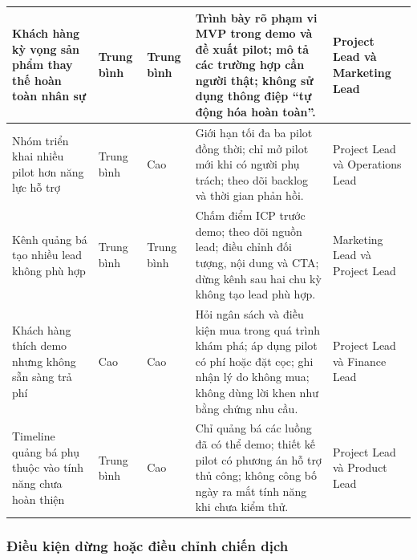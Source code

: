 \begin{table}[H]
\begin{tabularx}{\textwidth}{
        p{}
        p{}
        p{}
        X
        p{}
    }
        \hline

        Khách hàng kỳ vọng sản phẩm thay thế hoàn toàn nhân sự
        &
        Trung bình
        &
        Trung bình
        &
        Trình bày rõ phạm vi MVP trong demo và đề xuất pilot; mô tả các trường hợp cần người thật; không sử dụng thông điệp ``tự động hóa hoàn toàn''.
        &
        Project Lead và Marketing Lead \\

        \hline

        Nhóm triển khai nhiều pilot hơn năng lực hỗ trợ
        &
        Trung bình
        &
        Cao
        &
        Giới hạn tối đa ba pilot đồng thời; chỉ mở pilot mới khi có người phụ trách; theo dõi backlog và thời gian phản hồi.
        &
        Project Lead và Operations Lead \\

        \hline

        Kênh quảng bá tạo nhiều lead không phù hợp
        &
        Trung bình
        &
        Trung bình
        &
        Chấm điểm ICP trước demo; theo dõi nguồn lead; điều chỉnh đối tượng, nội dung và CTA; dừng kênh sau hai chu kỳ không tạo lead phù hợp.
        &
        Marketing Lead và Project Lead \\

        \hline

        Khách hàng thích demo nhưng không sẵn sàng trả phí
        &
        Cao
        &
        Cao
        &
        Hỏi ngân sách và điều kiện mua trong quá trình khám phá; áp dụng pilot có phí hoặc đặt cọc; ghi nhận lý do không mua; không dùng lời khen như bằng chứng nhu cầu.
        &
        Project Lead và Finance Lead \\

        \hline

        Timeline quảng bá phụ thuộc vào tính năng chưa hoàn thiện
        &
        Trung bình
        &
        Cao
        &
        Chỉ quảng bá các luồng đã có thể demo; thiết kế pilot có phương án hỗ trợ thủ công; không công bố ngày ra mắt tính năng khi chưa kiểm thử.
        &
        Project Lead và Product Lead \\

        \hline
    \end{tabularx}
\end{table}

\subsubsection{Điều kiện dừng hoặc điều chỉnh chiến dịch}

